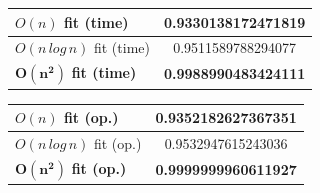 \documentclass{article}
\begin{document}
            \noindent
            \begin{minipage}{0.5\textwidth}
            \centering
            \begin{tabular}{|l|c|}
                \hline
                $O(n)$ fit (time) & 0.9330138172471819 \\
                \hline
                $O(n\,log\,n)$ fit (time) & 0.9511589788294077 \\
                \hline
                $\mathbf{O(n^2)}$ \textbf{fit (time)} & \textbf{0.9988990483424111} \\
                \hline
            \end{tabular}
            \end{minipage}            
            \begin{minipage}{0.5\textwidth}
            \centering
            \begin{tabular}{|l|c|}
                \hline
                $O(n)$ fit (op.) & 0.9352182627367351 \\
                \hline
                $O(n\,log\,n)$ fit (op.) & 0.9532947615243036 \\
                \hline
                $\mathbf{O(n^2)}$ \textbf{fit (op.)} & \textbf{0.9999999960611927}\\
                \hline
                
            \end{tabular}
            \end{minipage}
            
\end{document}
